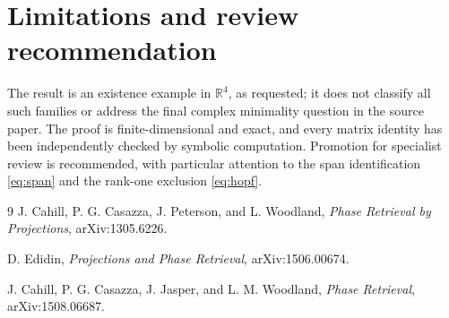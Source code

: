 \documentclass[11pt]{article}
\newcommand{\R}{\mathbb R}
\begin{document}
\section*{Limitations and review recommendation}

The result is an existence example in \(\R^4\), as requested; it does not
classify all such families or address the final complex minimality question
in the source paper.  The proof is finite-dimensional and exact, and every
matrix identity has been independently checked by symbolic computation.
Promotion for specialist review is recommended, with particular attention to
the span identification \eqref{eq:span} and the rank-one exclusion
\eqref{eq:hopf}.

\begin{thebibliography}{9}
J. Cahill, P. G. Casazza, J. Peterson, and L. Woodland,
\emph{Phase Retrieval by Projections}, arXiv:1305.6226.

D. Edidin, \emph{Projections and Phase Retrieval}, arXiv:1506.00674.

J. Cahill, P. G. Casazza, J. Jasper, and L. M. Woodland,
\emph{Phase Retrieval}, arXiv:1508.06687.
\end{thebibliography}
\end{document}
